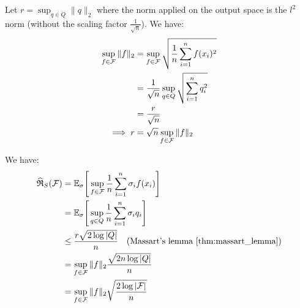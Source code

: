 \begin{proof*}
    Let $r=\sup_{q\in Q} \|q\|_2$ where the norm applied on the output space is the $l^2$ norm (without the scaling factor $\frac{1}{\sqrt n}$). We have:
    \begin{align*}
        \sup_{f\in\mathcal{F}}\|f\|_2 
            &= \sup_{f\in\mathcal{F}} \sqrt{
                \frac{1}{n} \sum_{i=1}^n f(x_i)^2
            } \\
            &= \frac{1}{\sqrt{n}} \sup_{q \in Q}\sqrt{
                \sum_{i=1}^n q_i^2
            } \\
            &= \frac{r}{\sqrt n} \\
        \implies 
        r &= \sqrt{n}\sup_{f\in\mathcal{F}}\|f\|_2 
    \end{align*} 

    \noindent We have:
    \begin{align*}
        \widehat{\mathfrak{R}}_S(\mathcal{F}) &= \mathbb{E}_\sigma \Bigg[ 
            \sup_{f\in\mathcal{F}}\frac{1}{n}\sum_{i=1}^n\sigma_i f(x_i)
         \Bigg] \\
        &= \mathbb{E}_\sigma \Bigg[ 
            \sup_{q\in Q}\frac{1}{n}\sum_{i=1}^n\sigma_i q_i
         \Bigg] \\
        &\le \frac{r\sqrt{2\log|Q|}}{n} \ \ \ (\text{Massart's lemma \ref{thm:massart_lemma}}) \\
        &= \sup_{f\in\mathcal{F}}\|f\|_2 \frac{\sqrt{2n\log|Q|}}{n} \\
        &= \sup_{f\in\mathcal{F}}\|f\|_2 \sqrt{\frac{2\log|\mathcal{F}|}{n}}
    \end{align*}
\end{proof*}


